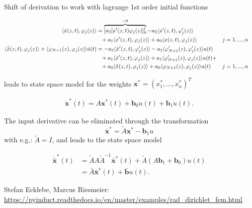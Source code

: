 \documentclass[10pt,a4paper]{article}
\begin{document}
	\noindent Shift of derivation to work with lagrange 1st order initial functions

	\begin{align*}
		\langle\dot{x}(z,t),\varphi_j(z)\rangle &=
		\overbrace{[a_2 [x'(z,t)\varphi_j(z)]_0^l}^{=0} - a_2 \langle x'(z,t),\varphi'_j(z)\rangle \\
		&\hphantom =+
		a_1 \langle x'(z,t), \varphi_j(z)\rangle  +
		a_0 \langle x(z,t), \varphi_j(z)\rangle && j=1,...,n \\
		\langle\dot{\hat{x}}(z,t),\varphi_j(z)\rangle + \langle\varphi_{N+1}(z),\varphi_j(z)\rangle \dot u(t) &= - a_2 \langle \hat x'(z,t),\varphi'_j(z)\rangle - a_2 \langle \varphi'_{N+1}(z),\varphi'_j(z)\rangle u(t) \\
		&\hphantom =+
		a_1 \langle \hat x'(z,t), \varphi_j(z)\rangle + a_1 \langle \varphi'_{N+1}(z), \varphi_j(z)\rangle u(t)  + \\
		&\hphantom =+
		a_0 \langle \hat x(z,t), \varphi_j(z)\rangle + a_0 \langle \varphi_{N+1}(z), \varphi_j(z)\rangle u(t) && j=1,...,n
	\end{align*}

	\noindent leads to state space model for the weights $\boldsymbol{x}^*=(x_1^*,...,x_n^*)^T$

	\begin{align*}
		\dot{\boldsymbol{x}}^*(t) = A \boldsymbol x^*(t) + \boldsymbol b_0 u(t) + \boldsymbol b_1 \dot{u}(t).
	\end{align*}

	\noindent The input derivative can be eliminated through the transformation
	\begin{equation*}
		\bar{\boldsymbol{x}}^* = \tilde A \boldsymbol x^* - \boldsymbol{b}_1 u
	\end{equation*}
	\noindent with e.g.: $\tilde A = I$, and leads to the state space model


	\begin{align*}
		\dot{\bar{\boldsymbol{x}}}^*(t) &= \tilde A A\tilde A^{-1} \bar{\boldsymbol{x}}^*(t) + \tilde A(A\boldsymbol b_1 + \boldsymbol b_0) u(t) \\
		&= \bar A \bar{\boldsymbol{x}}^*(t) +\bar{\boldsymbol{b}} u(t).
	\end{align*}




	
	
	\begin{thebibliography}{10}		
		Stefan Ecklebe, Marcus Riesmeier: \\
		\href{https://pyinduct.readthedocs.io/en/master/examples/rad\_dirichlet\_fem.html}{https://pyinduct.readthedocs.io/en/master/examples/rad\_dirichlet\_fem.html}
	\end{thebibliography}
\end{document}
